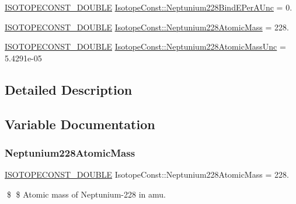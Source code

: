 \begin{DoxyCompactItemize}
\mbox{\hyperlink{group___isotope_const-_macros_ga8f45a7272ce02c0b4c65c44636ed719a}{I\+S\+O\+T\+O\+P\+E\+C\+O\+N\+S\+T\+\_\+\+D\+O\+U\+B\+LE}} \mbox{\hyperlink{group___isotope_const-_neptunium-_np228_gaf5fe287982893cbc38d9f7ee930d6212}{Isotope\+Const\+::\+Neptunium228\+Bind\+E\+Per\+A\+Unc}} = 0.
\item 
\mbox{\hyperlink{group___isotope_const-_macros_ga8f45a7272ce02c0b4c65c44636ed719a}{I\+S\+O\+T\+O\+P\+E\+C\+O\+N\+S\+T\+\_\+\+D\+O\+U\+B\+LE}} \mbox{\hyperlink{group___isotope_const-_neptunium-_np228_ga53062c9af212b3e86295422df0bd3ba8}{Isotope\+Const\+::\+Neptunium228\+Atomic\+Mass}} = 228.
\item 
\mbox{\hyperlink{group___isotope_const-_macros_ga8f45a7272ce02c0b4c65c44636ed719a}{I\+S\+O\+T\+O\+P\+E\+C\+O\+N\+S\+T\+\_\+\+D\+O\+U\+B\+LE}} \mbox{\hyperlink{group___isotope_const-_neptunium-_np228_ga9513e171d4f081ca07685cd6ee670379}{Isotope\+Const\+::\+Neptunium228\+Atomic\+Mass\+Unc}} = 5.\+4291e-\/05
\end{DoxyCompactItemize}


\subsection{Detailed Description}


\subsection{Variable Documentation}
\mbox{\label{group___isotope_const-_neptunium-_np228_ga53062c9af212b3e86295422df0bd3ba8}} 
\subsubsection{\texorpdfstring{Neptunium228\+Atomic\+Mass}{Neptunium228AtomicMass}}
{\footnotesize\ttfamily \mbox{\hyperlink{group___isotope_const-_macros_ga8f45a7272ce02c0b4c65c44636ed719a}{I\+S\+O\+T\+O\+P\+E\+C\+O\+N\+S\+T\+\_\+\+D\+O\+U\+B\+LE}} Isotope\+Const\+::\+Neptunium228\+Atomic\+Mass = 228.}

\$ \$ Atomic mass of Neptunium-\/228 in amu. \mbox{\label{group___isotope_const-_neptunium-_np228_ga9513e171d4f081ca07685cd6ee670379}} 
